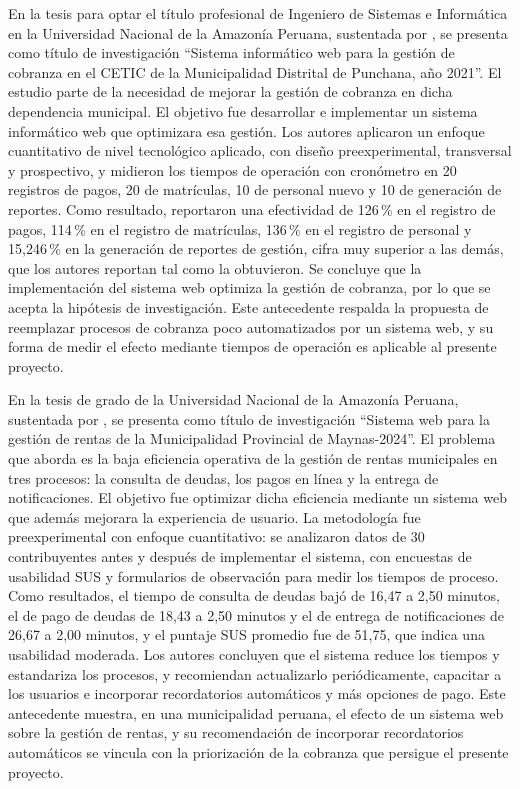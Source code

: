 \documentclass[12pt,a4paper]{report}
\begin{document}
En la tesis para optar el título profesional de Ingeniero de Sistemas e Informática en la Universidad Nacional de la Amazonía Peruana, sustentada por \textcite{pacaya2022}, se presenta como título de investigación ``Sistema informático web para la gestión de cobranza en el CETIC de la Municipalidad Distrital de Punchana, año 2021''. El estudio parte de la necesidad de mejorar la gestión de cobranza en dicha dependencia municipal. El objetivo fue desarrollar e implementar un sistema informático web que optimizara esa gestión. Los autores aplicaron un enfoque cuantitativo de nivel tecnológico aplicado, con diseño preexperimental, transversal y prospectivo, y midieron los tiempos de operación con cronómetro en 20 registros de pagos, 20 de matrículas, 10 de personal nuevo y 10 de generación de reportes. Como resultado, reportaron una efectividad de 126\,\% en el registro de pagos, 114\,\% en el registro de matrículas, 136\,\% en el registro de personal y 15,246\,\% en la generación de reportes de gestión, cifra muy superior a las demás, que los autores reportan tal como la obtuvieron. Se concluye que la implementación del sistema web optimiza la gestión de cobranza, por lo que se acepta la hipótesis de investigación. Este antecedente respalda la propuesta de reemplazar procesos de cobranza poco automatizados por un sistema web, y su forma de medir el efecto mediante tiempos de operación es aplicable al presente proyecto.

En la tesis de grado de la Universidad Nacional de la Amazonía Peruana, sustentada por \textcite{laulate2025}, se presenta como título de investigación ``Sistema web para la gestión de rentas de la Municipalidad Provincial de Maynas-2024''. El problema que aborda es la baja eficiencia operativa de la gestión de rentas municipales en tres procesos: la consulta de deudas, los pagos en línea y la entrega de notificaciones. El objetivo fue optimizar dicha eficiencia mediante un sistema web que además mejorara la experiencia de usuario. La metodología fue preexperimental con enfoque cuantitativo: se analizaron datos de 30 contribuyentes antes y después de implementar el sistema, con encuestas de usabilidad SUS y formularios de observación para medir los tiempos de proceso. Como resultados, el tiempo de consulta de deudas bajó de 16,47 a 2,50 minutos, el de pago de deudas de 18,43 a 2,50 minutos y el de entrega de notificaciones de 26,67 a 2,00 minutos, y el puntaje SUS promedio fue de 51,75, que indica una usabilidad moderada. Los autores concluyen que el sistema reduce los tiempos y estandariza los procesos, y recomiendan actualizarlo periódicamente, capacitar a los usuarios e incorporar recordatorios automáticos y más opciones de pago. Este antecedente muestra, en una municipalidad peruana, el efecto de un sistema web sobre la gestión de rentas, y su recomendación de incorporar recordatorios automáticos se vincula con la priorización de la cobranza que persigue el presente proyecto.
\end{document}
